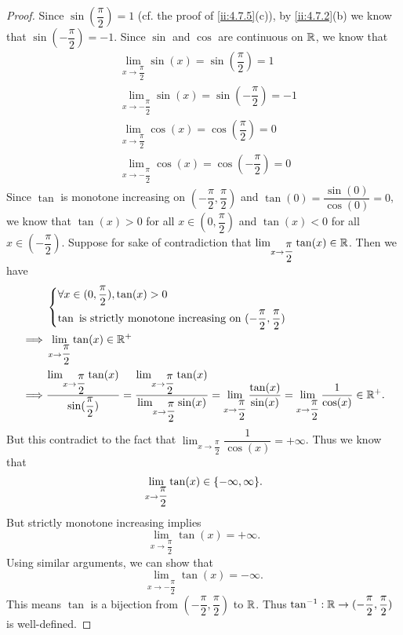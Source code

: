 \begin{proof}
  Since \(\sin(\dfrac{\pi}{2}) = 1\) (cf. the proof of \cref{ii:4.7.5}(c)), by \cref{ii:4.7.2}(b) we know that \(\sin(-\dfrac{\pi}{2}) = -1\).
  Since \(\sin\) and \(\cos\) are continuous on \(\mathbb{R}\), we know that
  \begin{align*}
     & \lim_{x \to \dfrac{\pi}{2}} \sin(x) = \sin(\dfrac{\pi}{2}) = 1    \\
     & \lim_{x \to -\dfrac{\pi}{2}} \sin(x) = \sin(-\dfrac{\pi}{2}) = -1 \\
     & \lim_{x \to \dfrac{\pi}{2}} \cos(x) = \cos(\dfrac{\pi}{2}) = 0    \\
     & \lim_{x \to -\dfrac{\pi}{2}} \cos(x) = \cos(-\dfrac{\pi}{2}) = 0
  \end{align*}
  Since \(\tan\) is monotone increasing on \((-\dfrac{\pi}{2}, \dfrac{\pi}{2})\) and \(\tan(0) = \dfrac{\sin(0)}{\cos(0)} = 0\), we know that \(\tan(x) > 0\) for all \(x \in (0, \dfrac{\pi}{2})\) and \(\tan(x) < 0\) for all \(x \in (-\dfrac{\pi}{2})\).
  Suppose for sake of contradiction that \(\lim_{x \to \dfrac{\pi}{2}} \tan(x) \in \mathbb{R}\).
  Then we have
  \begin{align*}
             & \begin{dcases}
                 \forall x \in (0, \dfrac{\pi}{2}), \tan(x) > 0 \\
                 \tan \text{ is strictly monotone increasing on } (-\dfrac{\pi}{2}, \dfrac{\pi}{2})
               \end{dcases}                                                                                                                                                                                      \\
    \implies & \lim_{x \to \dfrac{\pi}{2}} \tan(x) \in \mathbb{R}^+                                                                                                                                                                                                                           \\
    \implies & \dfrac{\lim_{x \to \dfrac{\pi}{2}} \tan(x)}{\sin(\dfrac{\pi}{2})} = \dfrac{\lim_{x \to \dfrac{\pi}{2}} \tan(x)}{\lim_{x \to \dfrac{\pi}{2}} \sin(x)} = \lim_{x \to \dfrac{\pi}{2}} \dfrac{\tan(x)}{\sin(x)} = \lim_{x \to \dfrac{\pi}{2}} \dfrac{1}{\cos(x)} \in \mathbb{R}^+.
  \end{align*}
  But this contradict to the fact that \(\lim_{x \to \dfrac{\pi}{2}} \dfrac{1}{\cos(x)} = +\infty\).
  Thus we know that
  \[
    \lim_{x \to \dfrac{\pi}{2}} \tan(x) \in \set{-\infty, \infty}.
  \]
  But strictly monotone increasing implies
  \[
    \lim_{x \to \dfrac{\pi}{2}} \tan(x) = +\infty.
  \]
  Using similar arguments, we can show that
  \[
    \lim_{x \to -\dfrac{\pi}{2}} \tan(x) = -\infty.
  \]
  This means \(\tan\) is a bijection from \((-\dfrac{\pi}{2}, \dfrac{\pi}{2})\) to \(\mathbb{R}\).
  Thus \(\tan^{-1} : \mathbb{R} \to (-\dfrac{\pi}{2}, \dfrac{\pi}{2})\) is well-defined.


\end{proof}
